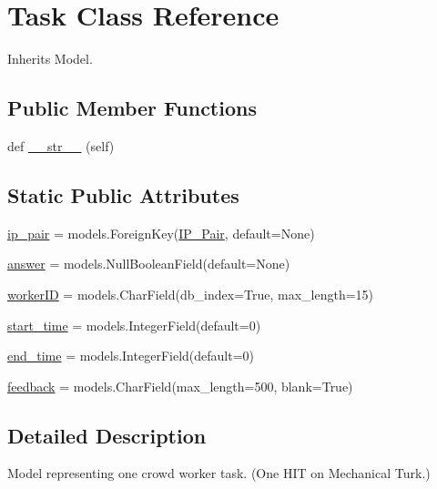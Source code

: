 \hypertarget{classdynamicfilterapp_1_1models_1_1_task}{}\section{Task Class Reference}
\label{classdynamicfilterapp_1_1models_1_1_task}


Inherits Model.

\subsection*{Public Member Functions}
\begin{DoxyCompactItemize}
\item 
def \mbox{\hyperlink{classdynamicfilterapp_1_1models_1_1_task_a23e8041ce1015febe4fdace3225714f9}{\+\_\+\+\_\+str\+\_\+\+\_\+}} (self)
\end{DoxyCompactItemize}
\subsection*{Static Public Attributes}
\begin{DoxyCompactItemize}
\item 
\mbox{\hyperlink{classdynamicfilterapp_1_1models_1_1_task_a6a81c84f60e4fc0f40d6812d6f6452c7}{ip\+\_\+pair}} = models.\+Foreign\+Key(\mbox{\hyperlink{classdynamicfilterapp_1_1models_1_1_i_p___pair}{I\+P\+\_\+\+Pair}}, default=None)
\item 
\mbox{\hyperlink{classdynamicfilterapp_1_1models_1_1_task_a8c4d9ee8d4f82d724070b97e70b9c4e5}{answer}} = models.\+Null\+Boolean\+Field(default=None)
\item 
\mbox{\hyperlink{classdynamicfilterapp_1_1models_1_1_task_ab569d6674e112f916cbe81a2304d418f}{worker\+ID}} = models.\+Char\+Field(db\+\_\+index=True, max\+\_\+length=15)
\item 
\mbox{\hyperlink{classdynamicfilterapp_1_1models_1_1_task_a2530c3908f0179486a4c2255f792e27a}{start\+\_\+time}} = models.\+Integer\+Field(default=0)
\item 
\mbox{\hyperlink{classdynamicfilterapp_1_1models_1_1_task_aa18736cc12f8beb112bd108c5a09ef8d}{end\+\_\+time}} = models.\+Integer\+Field(default=0)
\item 
\mbox{\hyperlink{classdynamicfilterapp_1_1models_1_1_task_aecc50b4643d1ea45de7afe20e729c160}{feedback}} = models.\+Char\+Field(max\+\_\+length=500, blank=True)
\end{DoxyCompactItemize}


\subsection{Detailed Description}
\begin{DoxyVerb}Model representing one crowd worker task. (One HIT on Mechanical Turk.)
\end{DoxyVerb}
 

